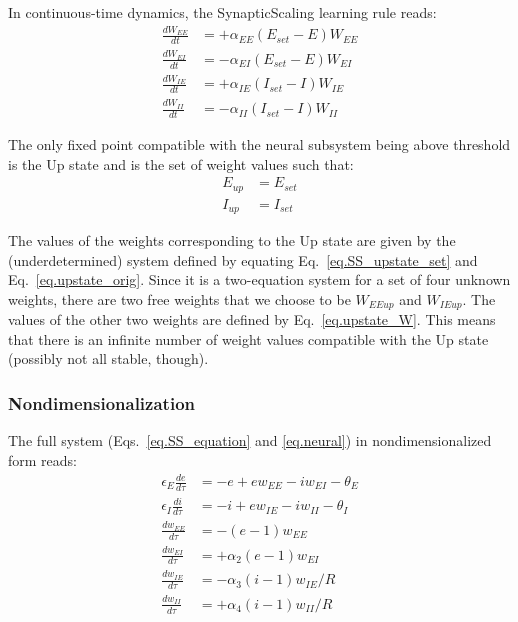 \documentclass[
twocolumn,
]{article}
\newcommand{\EE}{\mathit{EE}}
\newcommand{\EI}{\mathit{EI}}
\newcommand{\IE}{\mathit{IE}}
\newcommand{\II}{\mathit{II}}
\newcommand{\set}{\mathit{set}}
\newcommand{\up}{\mathit{up}}
\begin{document}
In continuous-time dynamics, the SynapticScaling learning rule \cite{VanRossum2000} reads:
\begin{equation}
\begin{aligned}
\frac{dW_{\EE}}{dt} & = +\alpha_{\EE} (E_{\set} - E) W_{\EE} \\
\frac{dW_{\EI}}{dt} & = -\alpha_{\EI} (E_{\set} - E) W_{\EI} \\
\frac{dW_{\IE}}{dt} & = +\alpha_{\IE} (I_{\set} - I) W_{\IE} \\
\frac{dW_{\II}}{dt} & = -\alpha_{\II} (I_{\set} - I) W_{\II}
\end{aligned}
\label{eq.SS_equation}
\end{equation}

The only fixed point compatible with the neural subsystem being above threshold is the Up state and is the set of weight values such that:
\begin{equation}
\begin{aligned}
E_{\up} & = E_{\set} \\
I_{\up} & = I_{\set}
\end{aligned}
\label{eq.SS_upstate_set}
\end{equation}

\noindent The values of the weights corresponding to the Up state are given by the (underdetermined) system defined by equating Eq.\ \ref{eq.SS_upstate_set} and Eq.\ \ref{eq.upstate_orig}. Since it is a two-equation system for a set of four unknown weights, there are two free weights that we choose to be $W_{\EE\up}$ and $W_{\IE\up}$. The values of the other two weights are defined by Eq.\ \ref{eq.upstate_W}. This means that there is an infinite number of weight values compatible with the Up state (possibly not all stable, though).




\subsubsection{Nondimensionalization}

The full system (Eqs.\ \ref{eq.SS_equation} and \ref{eq.neural}) in nondimensionalized form reads:
\begin{equation}
\begin{aligned}
\epsilon_E \frac{de}{d\tau} & = -e + e w_{\EE} - i w_{\EI} - \theta_E \\
\epsilon_I \frac{di}{d\tau} & = -i + e w_{\IE} - i w_{\II} - \theta_I \\
\frac{dw_{\EE}}{d\tau} & = -(e - 1)w_{\EE} \\
\frac{dw_{\EI}}{d\tau} & = +\alpha_2(e - 1)w_{\EI} \\
\frac{dw_{\IE}}{d\tau} & = -\alpha_3(i-1)w_{\IE}/R \\
\frac{dw_{\II}}{d\tau} & = +\alpha_4(i-1)w_{\II}/R
\end{aligned}
\label{eq.SS_full_norm}
\end{equation}
\end{document}

